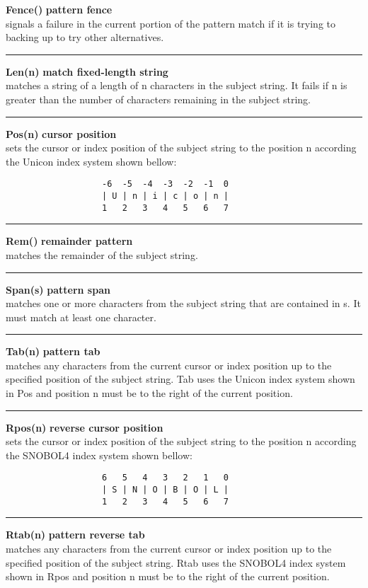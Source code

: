 \documentclass{article}
\begin{document}
\noindent\textbf{Fence()} \hfill\textbf{pattern fence}\\
signals a failure in the current portion of the pattern match if it is trying to backing up to try other alternatives.\\
\noindent\rule{14cm}{0.1pt}

\noindent\textbf{Len(n)} \hfill\textbf{match fixed-length string}\\
matches a string of a length of n characters in the subject string.  It fails if n is greater than the number of characters remaining in the subject string.\\
\noindent\rule{14cm}{0.1pt}

\noindent\textbf{Pos(n)} \hfill\textbf{cursor position}\\
sets the cursor or index position of the subject string to the position n according the Unicon index system shown bellow:
\begin{verbatim}
                   -6  -5  -4  -3  -2  -1  0
                   | U | n | i | c | o | n |
                   1   2   3   4   5   6   7
\end{verbatim}
\noindent\rule{14cm}{0.1pt}

\noindent\textbf{Rem()} \hfill\textbf{remainder pattern}\\
matches the remainder of the subject string.\\
\noindent\rule{14cm}{0.1pt}

\noindent\textbf{Span(s)} \hfill\textbf{pattern span}\\
matches one or more characters from the subject string that are contained in s.  It must match at least one character.\\
\noindent\rule{14cm}{0.1pt}

\noindent\textbf{Tab(n)} \hfill\textbf{pattern tab}\\
matches any characters from the current cursor or index position up to the specified position of the subject string. Tab uses the Unicon index system shown in Pos and position n must be to the right of the current position.\\
\noindent\rule{14cm}{0.1pt}

\noindent\textbf{Rpos(n)} \hfill\textbf{reverse cursor position}\\
sets the cursor or index position of the subject string to the position n according the SNOBOL4 index system shown bellow:
\begin{verbatim}
                   6   5   4   3   2   1   0
                   | S | N | O | B | O | L |
                   1   2   3   4   5   6   7
\end{verbatim}
\noindent\rule{14cm}{0.1pt}

\noindent\textbf{Rtab(n)} \hfill\textbf{pattern reverse tab}\\
matches any characters from the current cursor or index position up to the specified position of the subject string. Rtab uses the SNOBOL4 index system shown in Rpos and position n must be to the right of the current position.\\


\newpage
\textbf{}

\end{document}
